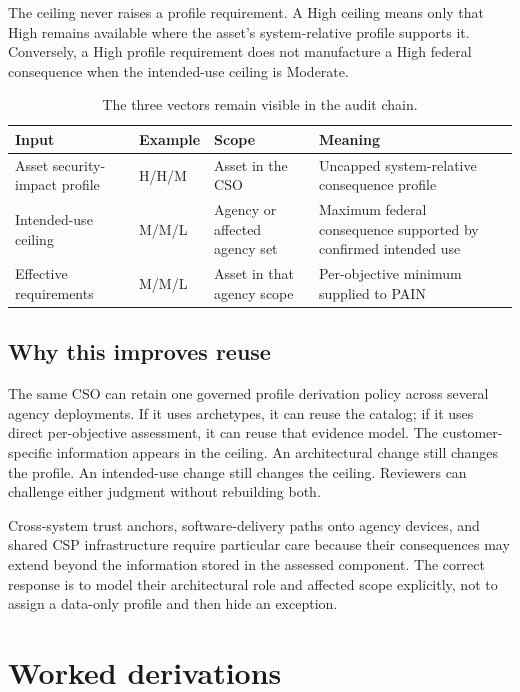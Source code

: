 \documentclass[11pt]{article}
\begin{document}
The ceiling never raises a profile requirement. A High ceiling means only that High
remains available where the asset's system-relative profile supports it.
Conversely, a High profile requirement does not manufacture a High federal
consequence when the intended-use ceiling is Moderate.

\begin{table}[H]
\centering
\small
\renewcommand{\arraystretch}{1.15}
\begin{tabularx}{\textwidth}{@{}P{0.25\textwidth}P{0.22\textwidth}P{0.22\textwidth}Y@{}}
\toprule
\textbf{Input} & \textbf{Example} & \textbf{Scope} & \textbf{Meaning} \\
\midrule
Asset security-impact profile & H/H/M & Asset in the CSO & Uncapped
system-relative consequence profile \\
Intended-use ceiling & M/M/L & Agency or affected agency set & Maximum federal
consequence supported by confirmed intended use \\
Effective requirements & M/M/L & Asset in that agency scope & Per-objective
minimum supplied to PAIN \\
\bottomrule
\end{tabularx}
\caption{The three vectors remain visible in the audit chain.}
\end{table}

\subsection{Why this improves reuse}

The same CSO can retain one governed profile derivation policy across several
agency deployments. If it uses archetypes, it can reuse the catalog; if it uses
direct per-objective assessment, it can reuse that evidence model. The
customer-specific information appears in the ceiling. An architectural change
still changes the profile. An intended-use change still changes the ceiling.
Reviewers can challenge either judgment without rebuilding both.

Cross-system trust anchors, software-delivery paths onto agency devices, and shared
CSP infrastructure require particular care because their consequences may extend
beyond the information stored in the assessed component. The correct response is
to model their architectural role and affected scope explicitly, not to assign a
data-only profile and then hide an exception.

\section{Worked derivations}
\end{document}
